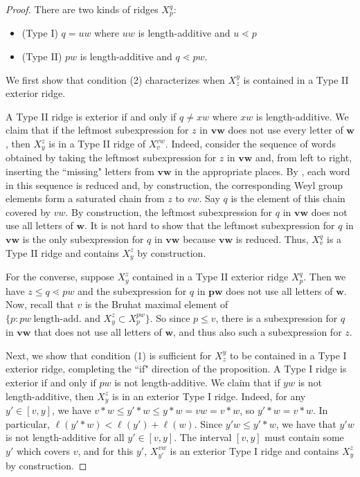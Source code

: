 \documentclass[11pt]{amsart}
\theoremstyle{definition}
\def\bw{\mathbf{w}}
\def\bp{\mathbf{p}}
\def\bv{\mathbf{v}}
\begin{document}
\begin{proof}
There are two kinds of ridges $X_p^q$: 
\begin{itemize}
	\item (Type I) $q=uw$ where $uw$ is length-additive and $u \lessdot p$
	\item(Type II) $pw$ is length-additive and $q \lessdot pw$.
\end{itemize} 
	We first show that condition (2) characterizes when $X^y_z$ is contained in a Type II exterior ridge.
	
	
	A Type II ridge is exterior if and only if $q \neq xw$ where $xw$ is length-additive. We claim that if the leftmost subexpression for $z$ in $\bv \bw$ does not use every letter of $\bw$, then $X_y^z$ is in a Type II ridge of $X_v^{vw}$. Indeed, consider the sequence of words obtained by taking the leftmost subexpression for $z$ in $\bv \bw$ and, from left to right, inserting the ``missing" letters from $\bv \bw$ in the appropriate places. By \cite[Lemma 2.2.1]{BB05}, each word in this sequence is reduced and, by construction, the corresponding Weyl group elements form a saturated chain from $z$ to $vw$. Say $q$ is the element of this chain covered by $vw$. By construction, the leftmost subexpression for $q$ in $\bv \bw$ does not use all letters of $\bw$. It is not hard to show that the leftmost subexpression for $q$ in $\bv \bw$ is the only subexpression for $q$ in $\bv\bw$ because $\bv \bw$ is reduced. Thus, $X_v^q$ is a Type II ridge and contains $X_y^z$ by construction.
	
	For the converse, suppose $X_y^z$ contained in a Type II exterior ridge $X_p^q$. Then we have $z \leq q \lessdot pw$ and the subexpression for $q$ in $\bp \bw$ does not use all letters of $\bw$. Now, recall that $v$ is the Bruhat maximal element of $\{p: pw~\text{length-add. and }X_y^z \subset X_p^{pw}\}$. So since $p \leq v$, there is a subexpression for $q$ in $\bv \bw$ that does not use all letters of $\bw$, and thus also such a subexpression for $z$.
	
	
	Next, we show that condition (1) is sufficient for $X^y_z$ to be contained in a Type I exterior ridge, completing the ``if" direction of the proposition. A Type I ridge is exterior if and only if $pw$ is not length-additive. We claim that if $yw$ is not length-additive, then $X_y^z$ is in an exterior Type I ridge. Indeed, for any $y' \in [v,y]$, we have $v * w \leq  y' * w \leq y*w = vw = v*w$, so $y'*w = v*w$. In particular, $\ell(y' * w) < \ell(y') + \ell(w)$. Since $y' w \leq y' * w$, we have that $y' w$ is not length-additive for all $y' \in [v, y]$. The interval $[v,y]$ must contain some $y'$ which covers $v$, and for this $y'$, $X_{y'}^{vw}$ is an exterior Type I ridge and contains $X_y^z$ by construction.
	

\end{proof}
\end{document}
